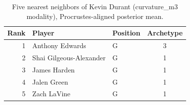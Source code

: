 \begin{table}[htbp]
  \centering\small
  \begin{tabular}{rllc}
    \toprule
    Rank & Player & Position & Archetype \\
    \midrule
    1 & Anthony Edwards & G & 3 \\
    2 & Shai Gilgeous-Alexander & G & 1 \\
    3 & James Harden & G & 1 \\
    4 & Jalen Green & G & 1 \\
    5 & Zach LaVine & G & 1 \\
    \bottomrule
  \end{tabular}
  \caption{Five nearest neighbors of Kevin Durant (curvature_m3 modality), Procrustes-aligned posterior mean.}
  \label{tab:Kevin_Durant_neighbors_curvature_m3}
\end{table}

